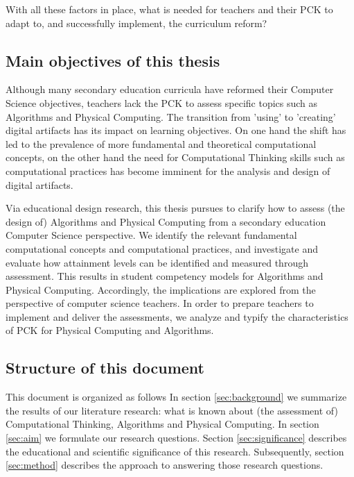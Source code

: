 With all these factors in place, what is needed for teachers and their PCK to adapt to, and successfully implement, the curriculum reform?

\subsection{Main objectives of this thesis}


Although many secondary education curricula have reformed their Computer Science objectives, teachers lack the PCK to assess specific topics such as Algorithms and Physical Computing. The transition from 'using' to 'creating' digital artifacts has its impact on learning objectives. On one hand the shift has led to the prevalence of more fundamental and theoretical computational concepts, on the other hand the need for Computational Thinking skills such as computational practices has become imminent for the analysis and design of digital artifacts.

Via educational design research, this thesis pursues to clarify how to assess (the design of) Algorithms and Physical Computing from a secondary education Computer Science perspective. We identify the relevant fundamental computational concepts and computational practices, and investigate and evaluate how attainment levels can be identified and measured through assessment. This results in student competency models for Algorithms and Physical Computing. Accordingly, the implications are explored from the perspective of computer science teachers. In order to prepare teachers to implement and deliver the assessments, we analyze and typify the characteristics of PCK for Physical Computing and Algorithms.


\subsection{Structure of this document}
This document is organized as follows
In section \ref{sec:background} we summarize the results of our literature research: what is known about (the assessment of) Computational Thinking, Algorithms and Physical Computing. In section \ref{sec:aim} we formulate our research questions. Section \ref{sec:significance} describes the educational and scientific significance of this research. Subsequently, section \ref{sec:method} describes the approach to answering those research questions. 